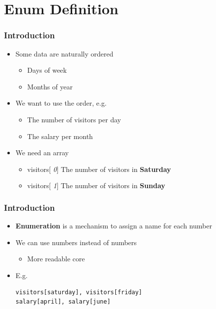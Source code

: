 \documentclass{../c-lecture}
\begin{document}
\section{Enum Definition}

\begin{frame}
  \frametitle{Introduction}
  \begin{itemize}
    \item Some data are naturally ordered
    \begin{itemize}
      \item Days of week
      \item Months of year
    \end{itemize}
    \item We want to use the order, e.g.
    \begin{itemize}
      \item The number of visitors per day
      \item The salary per month
    \end{itemize}
    \item We need an array
    \begin{itemize}
      \item
        visitors[\textit{\color{LimeGreen} 0}] \textrightarrow The number of visitors
        in \textbf{\color{YellowOrange} Saturday}

      \item
        visitors[\textit{\color{LimeGreen} 1}] \textrightarrow The number of visitors
        in \textbf{\color{YellowOrange} Sunday}
    \end{itemize}
  \end{itemize}
\end{frame}

\begin{frame}[fragile]
  \frametitle{Introduction}
  \begin{itemize}
    \item
      \textbf{\color{YellowOrange} Enumeration} is a mechanism to assign a name
      for each number

    \item We can use numbers instead of numbers
    \begin{itemize}
      \item More readable core
    \end{itemize}
    \item E.g.
    \begin{verbatim}
visitors[saturday], visitors[friday]
salary[april], salary[june]
    \end{verbatim}
  \end{itemize}
\end{frame}
\end{document}
